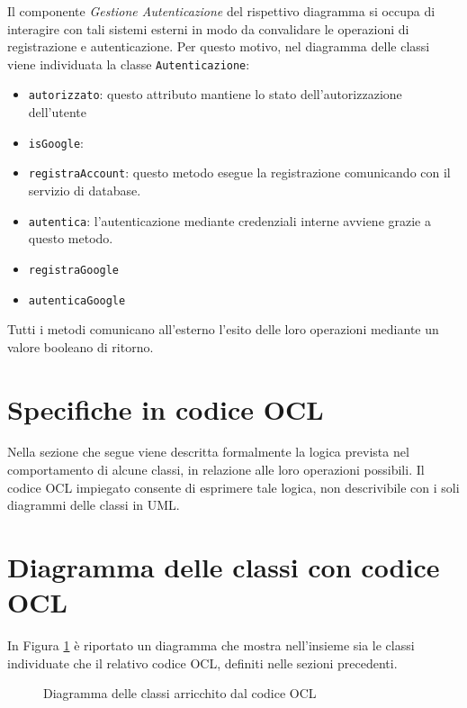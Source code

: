 \documentclass[11pt, a4paper]{article}
\theoremstyle{definition} %
\begin{document}
Il componente \textit{Gestione Autenticazione} del rispettivo diagramma si
occupa di interagire con tali sistemi esterni in modo da convalidare le
operazioni di registrazione e autenticazione. Per questo motivo, nel diagramma
delle classi viene individuata la classe \texttt{Autenticazione}:
\begin{itemize}
    \item \texttt{autorizzato}: questo attributo mantiene lo stato dell'autorizzazione
    dell'utente
    \item \texttt{isGoogle}:
    \item \texttt{registraAccount}: questo metodo esegue la registrazione
    comunicando con il servizio di database.
    \item \texttt{autentica}: l'autenticazione mediante credenziali interne
    avviene grazie a questo metodo.
    \item \texttt{registraGoogle}
    \item \texttt{autenticaGoogle}
\end{itemize}
Tutti i metodi comunicano all'esterno l'esito delle loro operazioni mediante
un valore booleano di ritorno.


\newpage
\section{Specifiche in codice OCL}
Nella sezione che segue viene descritta formalmente la logica prevista
nel comportamento di alcune classi, in relazione alle loro operazioni
possibili. Il codice OCL impiegato consente di esprimere tale logica,
non descrivibile con i soli diagrammi delle classi in UML.

\newpage
\section{Diagramma delle classi con codice OCL}
In Figura \ref{umlocl} è riportato un diagramma che mostra nell'insieme
sia le classi individuate che il relativo codice OCL, definiti nelle
sezioni precedenti.

\begin{figure}[H]
\centering
\caption{Diagramma delle classi arricchito dal codice OCL}
\label{umlocl}
\end{figure}
\end{document}
